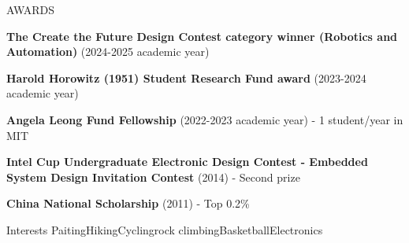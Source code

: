 \documentclass{resume} %
\begin{document}
\begin{rSection}{AWARDS}
\begin{itemlabel}
\item \textbf{The Create the Future Design Contest category winner (Robotics and Automation)} (2024-2025 academic year)
\smallskip
\smallskip

\begin{itemlabel}
\item \textbf{Harold Horowitz (1951) Student Research Fund award} (2023-2024 academic year)
\smallskip
\smallskip

\item \textbf{Angela Leong Fund Fellowship} (2022-2023 academic year) - 1 student/year in MIT
\smallskip
\smallskip

\item \textbf{Intel Cup Undergraduate Electronic Design Contest - Embedded System Design Invitation Contest} (2014) - Second prize
\smallskip
\smallskip

\item \textbf{China National Scholarship} (2011) - Top 0.2\%
\smallskip
\smallskip

\end{itemlabel}
\end{itemlabel}
\end{rSection}

\begin{rSection}{Interests}
Paiting\hspace{0.5cm}Hiking\hspace{0.5cm}Cycling\hspace{0.5cm}rock climbing\hspace{0.5cm}Basketball\hspace{0.5cm}Electronics
\end{rSection}

\end{document}
